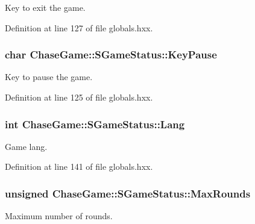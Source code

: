 Key to exit the game. 



Definition at line 127 of file globals.\-hxx.

\hypertarget{struct_chase_game_1_1_s_game_status_aaa0cca00432a2ac7fae4be521164f5c2}{
\subsubsection[{Key\-Pause}]{\setlength{\rightskip}{0pt plus 5cm}char Chase\-Game\-::\-S\-Game\-Status\-::\-Key\-Pause}}\label{struct_chase_game_1_1_s_game_status_aaa0cca00432a2ac7fae4be521164f5c2}


Key to pause the game. 



Definition at line 125 of file globals.\-hxx.

\hypertarget{struct_chase_game_1_1_s_game_status_a93c5db2ceb07569075406e865949b4d9}{
\subsubsection[{Lang}]{\setlength{\rightskip}{0pt plus 5cm}int Chase\-Game\-::\-S\-Game\-Status\-::\-Lang}}\label{struct_chase_game_1_1_s_game_status_a93c5db2ceb07569075406e865949b4d9}


Game lang. 



Definition at line 141 of file globals.\-hxx.

\hypertarget{struct_chase_game_1_1_s_game_status_a812deafc733953eaa199eba4ea8216f7}{
\subsubsection[{Max\-Rounds}]{\setlength{\rightskip}{0pt plus 5cm}unsigned Chase\-Game\-::\-S\-Game\-Status\-::\-Max\-Rounds}}\label{struct_chase_game_1_1_s_game_status_a812deafc733953eaa199eba4ea8216f7}


Maximum number of rounds. 



